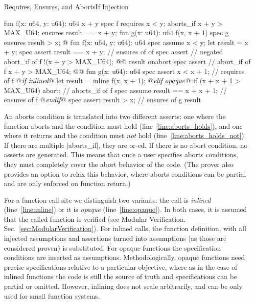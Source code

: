 \begin{Figure}
  \caption{Requires, Ensures, and AbortsIf Injection}
  \label{fig:RequiresEnsuresAbortsIf}
  \centering
\begin{MoveBox}
  fun f(x: u64, y: u64): u64 { x + y }
  spec f {
    requires x < y;
    aborts_if x + y > MAX_U64;
    ensures result == x + y;
  }
  fun g(x: u64): u64 { f(x, x + 1) }
  spec g {
    ensures result > x;
  }
  @\transform@
  fun f(x: u64, y: u64): u64 {
    spec assume x < y;
    let result = x + y;
    spec assert result == x + y;     // ensures of of
    spec assert                      // negated abort_if of f
      !(x + y > MAX_U64); @\label{line:aborts_holds_not}@
    result
  } onabort {
    spec assert                      // abort_if of f
      x + y > MAX_U64; @\label{line:aborts_holds}@
  }
  fun g(x: u64): u64 {
    spec assert x < x + 1;           // requires of f
@$\textrm{\it if inlined}$\label{line:inline}@
    let result = inline f(x, x + 1);
@$\textrm{\it elif opaque}$\label{line:opaque}@
    if (x + x + 1 > MAX_U64) abort;  // aborts_if of f
    spec assume result == x + x + 1; // ensures of f
@$\textrm{\it endif}$@
    spec assert result > x;          // ensures of g
    result
  }
\end{MoveBox}
\end{Figure}

An aborts condition is translated into two different asserts: one where the
function aborts and the condition must hold (line~\ref{line:aborts_holds}), and
one where it returns and the condition must \emph{not} hold
(line~\ref{line:aborts_holds_not}). If there are multiple |aborts_if|, they are
or-ed. If there is no abort condition, no asserts are generated. This means
that once a user specifies aborts conditions, they must completely cover the
abort behavior of the code. (The prover also provides an option to relax this
behavior, where aborts conditions can be partial and are only enforced on
function return.)

For a function call site we distinguish two variants: the call is \emph{inlined}
(line~\ref{line:inline}) or it is \emph{opaque} (line~\ref{line:opaque}). In
both cases, it is assumed that the called function is verified (see Modular
Verification, Sec.~\ref{sec:ModularVerification}). For inlined calls, the
function definition, with all injected assumptions and assertions turned into
assumptions (as those are considered proven) is substituted. For opaque
functions the specification conditions are inserted as
assumptions. Methodologically, opaque functions need precise specifications
relative to a particular objective, where as in the case of inlined functions
the code is still the source of truth and specifications can be partial or
omitted. However, inlining does not scale arbitrarily, and can be only used for
small function systems.

